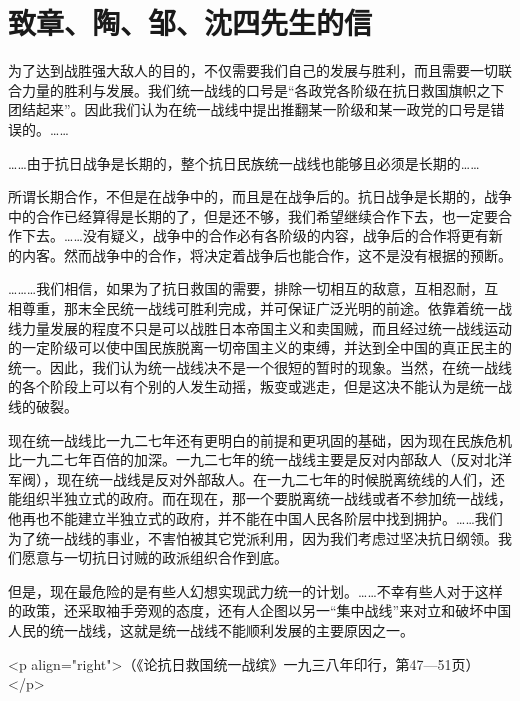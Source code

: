 \section[致章、陶、邹、沈四先生的信（一九三八年八月十日）]{致章、陶、邹、沈四先生的信}


为了达到战胜强大敌人的目的，不仅需要我们自己的发展与胜利，而且需要一切联合力量的胜利与发展。我们统一战线的口号是“各政党各阶级在抗日救国旗帜之下团结起来”。因此我们认为在统一战线中提出推翻某一阶级和某一政党的口号是错误的。……

……由于抗日战争是长期的，整个抗日民族统一战线也能够且必须是长期的……

所谓长期合作，不但是在战争中的，而且是在战争后的。抗日战争是长期的，战争中的合作已经算得是长期的了，但是还不够，我们希望继续合作下去，也一定要合作下去。……没有疑义，战争中的合作必有各阶级的内容，战争后的合作将更有新的内客。然而战争中的合作，将决定着战争后也能合作，这不是没有根据的预断。

………我们相信，如果为了抗日救国的需要，排除一切相互的敌意，互相忍耐，互相尊重，那末全民统一战线可胜利完成，并可保证广泛光明的前途。依靠着统一战线力量发展的程度不只是可以战胜日本帝国主义和卖国贼，而且经过统一战线运动的一定阶级可以使中国民族脱离一切帝国主义的束缚，并达到全中国的真正民主的统一。因此，我们认为统一战线决不是一个很短的暂时的现象。当然，在统一战线的各个阶段上可以有个别的人发生动摇，叛变或逃走，但是这决不能认为是统一战线的破裂。

现在统一战线比一九二七年还有更明白的前提和更巩固的基础，因为现在民族危机比一九二七年百倍的加深。一九二七年的统一战线主要是反对内部敌人（反对北洋军阀），现在统一战线是反对外部敌人。在一九二七年的时候脱离统线的人们，还能组织半独立式的政府。而在现在，那一个要脱离统一战线或者不参加统一战线，他再也不能建立半独立式的政府，并不能在中国人民各阶层中找到拥护。……我们为了统一战线的事业，不害怕被其它党派利用，因为我们考虑过坚决抗日纲领。我们愿意与一切抗日讨贼的政派组织合作到底。

但是，现在最危险的是有些人幻想实现武力统一的计划。……不幸有些人对于这样的政策，还采取袖手旁观的态度，还有人企图以另一“集中战线”来对立和破坏中国人民的统一战线，这就是统一战线不能顺利发展的主要原因之一。

<p align="right">（《论抗日救国统一战缤》一九三八年印行，第47—51页）</p>

